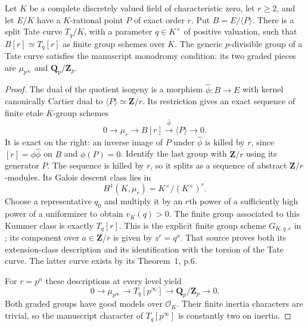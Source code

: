 \begin{lemma}
\label{lem:B-RD29-isogeny-Tate}
Let $K$ be a complete discretely valued field of characteristic zero,
let $r\geq2$, and let $E/K$ have a $K$-rational point $P$ of exact
order $r$. Put $B=E/\langle P\rangle$. There is a split Tate curve
$T_q/K$, with a parameter $q\in K^\times$ of positive valuation,
such that $B[r]\simeq T_q[r]$ as finite group schemes over $K$.
The generic $p$-divisible group of a Tate curve satisfies the
manuscript monodromy condition: its two graded pieces are
$\mu_{p^\infty}$ and $\mathbf Q_p/\mathbf Z_p$.
\end{lemma}
\begin{proof}
The dual of the quotient isogeny is a morphism
$\widehat\phi:B\to E$ with kernel canonically Cartier dual to
$\langle P\rangle\simeq\mathbf Z/r$. Its restriction gives an
exact sequence of finite etale $K$-group schemes
\[
 0\longrightarrow\mu_r\longrightarrow B[r]
   \xrightarrow{\widehat\phi}\langle P\rangle
   \longrightarrow0.                                      \tag{B-RD29.1}
\]
It is exact on the right: an inverse image of $P$ under
$\widehat\phi$ is killed by $r$, since
$[r]=\phi\widehat\phi$ on $B$ and $\phi(P)=0$.
Identify the last group with $\mathbf Z/r$ using its generator $P$.
The sequence is killed by $r$, so it splits as a sequence of
abstract $\mathbf Z/r$-modules. Its Galois descent class lies in
\[
 H^1(K,\mu_r)=K^\times/(K^\times)^r.
\]
Choose a representative $q_0$ and multiply it by an $r$th power
of a sufficiently high power of a uniformizer to obtain $v_K(q)>0$.
The finite group associated to this Kummer class is exactly
$T_q[r]$. This is the explicit finite group scheme
$G_{K,q,r}$ in \cite[``Points of finite order'', pp.18--19]{Tate1995Uniformization};
its component over $a\in\mathbf Z/r$ is given by $z^r=q^a$.
That source proves both its extension-class description and its
identification with the torsion of the Tate curve. The latter
curve exists by its Theorem~1, p.6.

For $r=p^n$ these descriptions at every level yield
\[
 0\longrightarrow\mu_{p^\infty}\longrightarrow T_q[p^\infty]
   \longrightarrow\mathbf Q_p/\mathbf Z_p\longrightarrow0.
\]
Both graded groups have good models over $\mathcal O_K$.
Their finite inertia characters are trivial, so the manuscript
character of $T_q[p^\infty]$ is constantly two on inertia.
\end{proof}

